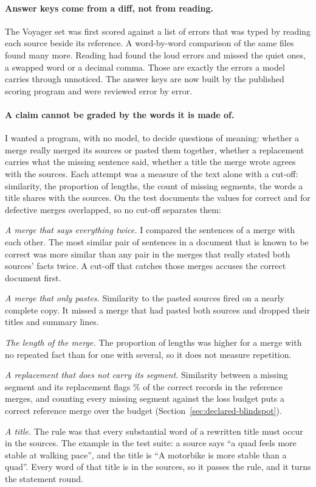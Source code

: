 \paragraph{Answer keys come from a diff, not from reading.} The Voyager set was first scored against a list of errors that was typed by reading each source beside its reference. A word-by-word comparison of the same files found many more. Reading had found the loud errors and missed the quiet ones, a swapped word or a decimal comma. Those are exactly the errors a model carries through unnoticed. The answer keys are now built by the published scoring program and were reviewed error by error.

\paragraph{A claim cannot be graded by the words it is made of.} I wanted a program, with no model, to decide questions of meaning: whether a merge really merged its sources or pasted them together, whether a replacement carries what the missing sentence said, whether a title the merge wrote agrees with the sources. Each attempt was a measure of the text alone with a cut-off: similarity, the proportion of lengths, the count of missing segments, the words a title shares with the sources. On the test documents the values for correct and for defective merges overlapped, so no cut-off separates them:
\begin{points}
\item \emph{A merge that says everything twice.} I compared the sentences of a merge with each other. The most similar pair of sentences in a document that is known to be correct was more similar than any pair in the merges that really stated both sources' facts twice. A cut-off that catches those merges accuses the correct document first.
\item \emph{A merge that only pastes.} Similarity to the pasted sources fired on a nearly complete copy. It missed a merge that had pasted both sources and dropped their titles and summary lines.
\item \emph{The length of the merge.} The proportion of lengths was higher for a merge with no repeated fact than for one with several, so it does not measure repetition.
\item \emph{A replacement that does not carry its segment.} Similarity between a missing segment and its replacement flags \% of the correct records in the reference merges, and counting every missing segment against the loss budget puts a correct reference merge over the budget (Section~\ref{sec:declared-blindspot}).
\item \emph{A title.} The rule was that every substantial word of a rewritten title must occur in the sources. The example in the test suite: a source says ``a quad feels more stable at walking pace'', and the title is ``A motorbike is more stable than a quad''. Every word of that title is in the sources, so it passes the rule, and it turns the statement round.
\end{points}

